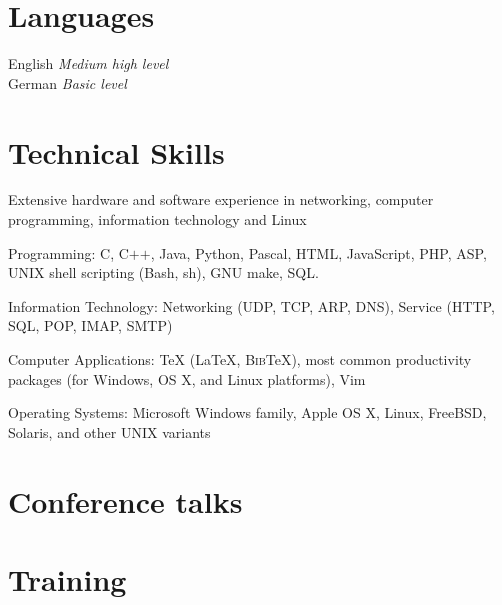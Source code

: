 \section{Languages}
%
English \textit{Medium high level}\\%
German \textit{Basic level}%

\section{Technical Skills}
%
Extensive hardware and software experience in networking, computer
programming, information technology and Linux

\blankline

Programming: C, C$+$$+$, Java, Python, Pascal, HTML, JavaScript, PHP, ASP, UNIX
        shell scripting (Bash, sh), GNU make, SQL.

\blankline

Information Technology: Networking (UDP, TCP, ARP, DNS),
Service (HTTP, SQL, POP, IMAP, SMTP)

\blankline

Computer Applications: \TeX{} (\LaTeX{}, B\textsc{ib}\TeX{}),
        most common productivity packages (for Windows, OS X, and Linux
        platforms), Vim

\blankline

Operating Systems: Microsoft Windows family, Apple OS X, Linux, FreeBSD,
        Solaris, and other UNIX variants


\section{Conference talks}


\section{Training}


